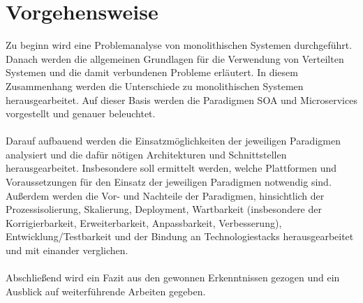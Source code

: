 \section{Vorgehensweise}
\label{sec:Vorgehensweise}
Zu beginn wird eine Problemanalyse von monolithischen Systemen durchgeführt. Danach werden die allgemeinen Grundlagen für die Verwendung von Verteilten Systemen und die damit verbundenen Probleme erläutert. In diesem Zusammenhang werden die Unterschiede zu monolithischen Systemen herausgearbeitet. Auf dieser Basis werden die Paradigmen SOA und Microservices vorgestellt und genauer beleuchtet.
\\\\
Darauf aufbauend werden die Einsatzmöglichkeiten der jeweiligen Paradigmen analysiert und die dafür nötigen Architekturen und Schnittstellen herausgearbeitet. Insbesondere soll ermittelt werden, welche Plattformen und Voraussetzungen für den Einsatz der jeweiligen Paradigmen notwendig sind. Außerdem werden die Vor- und Nachteile der Paradigmen, hinsichtlich der Prozessisolierung, Skalierung, Deployment, Wartbarkeit (insbesondere der Korrigierbarkeit, Erweiterbarkeit, Anpassbarkeit, Verbesserung), Entwicklung/Testbarkeit und der Bindung an Technologiestacks herausgearbeitet und mit einander verglichen.
\\\\
Abschließend wird ein Fazit aus den gewonnen Erkenntnissen gezogen und ein Ausblick auf weiterführende Arbeiten gegeben.